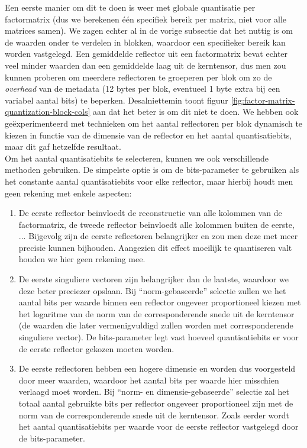 Een eerste manier om dit te doen is weer met globale quantisatie per factormatrix (dus we berekenen \'e\'en specifiek bereik per matrix, niet voor alle matrices samen). We zagen echter al in de vorige subsectie dat het nuttig is om de waarden onder te verdelen in blokken, waardoor een specifieker bereik kan worden vastgelegd. Een gemiddelde reflector uit een factormatrix bevat echter veel minder waarden dan een gemiddelde laag uit de kerntensor, dus men zou kunnen proberen om meerdere reflectoren te groeperen per blok om zo de \textit{overhead} van de metadata (12 bytes per blok, eventueel 1 byte extra bij een variabel aantal bits) te beperken. Desalniettemin toont figuur \ref{fig:factor-matrix-quantization-block-cols} aan dat het beter is om dit niet te doen. We hebben ook ge\"experimenteerd met technieken om het aantal reflectoren per blok dynamisch te kiezen in functie van de dimensie van de reflector en het aantal quantisatiebits, maar dit gaf hetzelfde resultaat.\\

Om het aantal quantisatiebits te selecteren, kunnen we ook verschillende methoden gebruiken. De simpelste optie is om de bits-parameter te gebruiken als het constante aantal quantisatiebits voor elke reflector, maar hierbij houdt men geen rekening met enkele aspecten:

\begin{enumerate}

\item De eerste reflector be\"invloedt de reconstructie van alle kolommen van de factormatrix, de tweede reflector be\"invloedt alle kolommen buiten de eerste, ... Bijgevolg zijn de eerste reflectoren belangrijker en zou men deze met meer precisie kunnen bijhouden. Aangezien dit effect moeilijk te quantiseren valt houden we hier geen rekening mee.

\item De eerste singuliere vectoren zijn belangrijker dan de laatste, waardoor we deze beter preciezer opslaan. Bij ``norm-gebaseerde'' selectie zullen we het aantal bits per waarde binnen een reflector ongeveer proportioneel kiezen met het logaritme van de norm van de corresponderende snede uit de kerntensor (de waarden die later vermenigvuldigd zullen worden met corresponderende singuliere vector). De bits-parameter legt vast hoeveel quantisatiebits er voor de eerste reflector gekozen moeten worden.

\item De eerste reflectoren hebben een hogere dimensie en worden dus voorgesteld door meer waarden, waardoor het aantal bits per waarde hier misschien verlaagd moet worden. Bij ``norm- en dimensie-gebaseerde'' selectie zal het totaal aantal gebruikte bits per reflector ongeveer proportioneel zijn met de norm van de corresponderende snede uit de kerntensor. Zoals eerder wordt het aantal quantisatiebits per waarde voor de eerste reflector vastgelegd door de bits-parameter.

\end{enumerate}

